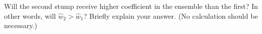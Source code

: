 \item {} Will the second stump receive higher coefficient in the ensemble than the first? In other words, will $\hat{w}_2 > \hat{w}_1$? Briefly explain your answer. (No calculation should be necessary.)